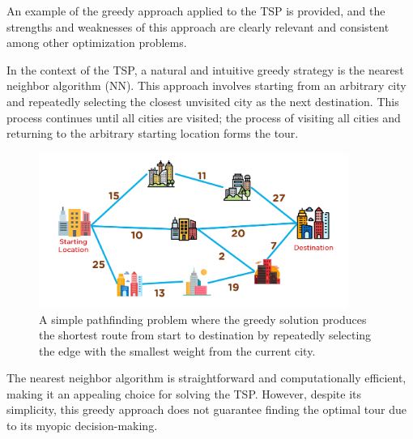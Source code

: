 \documentclass[11pt]{report}
\begin{document}
        An example of the greedy approach applied to the TSP is provided, and the strengths and weaknesses of this approach are clearly relevant and consistent among other optimization problems\cite{GUTIN200281}.

        In the context of the TSP, a natural and intuitive greedy strategy is the nearest neighbor algorithm (NN). This approach involves starting from an arbitrary city and repeatedly selecting the closest unvisited city as the next destination. This process continues until all cities are visited; the process of visiting all cities and returning to the arbitrary starting location forms the tour. 

        \begin{figure}[h!]
            \centering
            \includegraphics[width=0.9\textwidth,keepaspectratio]{Images/Thumbnail_Greedy_Problem.jpg}
            \caption{A simple pathfinding problem where the greedy solution produces the shortest route from start to destination by repeatedly selecting the edge with the smallest weight from the current city.}
            \label{fig:greedy-tsp-good}
        \end{figure}

        The nearest neighbor algorithm is straightforward and computationally efficient, making it an appealing choice for solving the TSP\cite{reinelt2003traveling}. However, despite its simplicity, this greedy approach does not guarantee finding the optimal tour due to its myopic decision-making.
\end{document}
